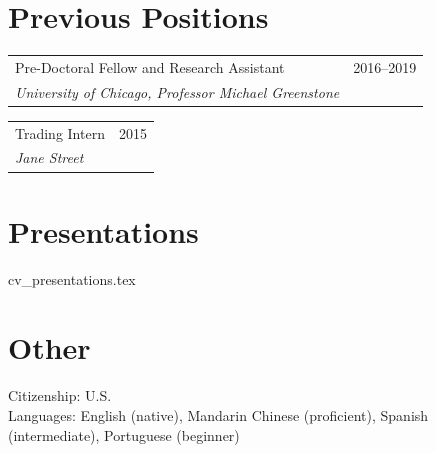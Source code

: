 \documentclass[12pt, a4paper]{article}
\makeatletter
\newcommand{\entry}[3]{%
  \noindent
  \begin{tabular*}{\textwidth}{@{\extracolsep{\fill}} p{0.8\textwidth} r}
    #1 & {\small #2} \\
    \emph{#3} &
  \end{tabular*}%
  \vspace{0.3em}
}
\makeatother
\begin{document}
\section*{Previous Positions}
\entry{Pre-Doctoral Fellow and Research Assistant}{2016–2019}{University of Chicago, Professor Michael Greenstone}
\entry{Trading Intern}{2015}{Jane Street}

\section*{Presentations}
{cv_presentations.tex}

\section*{Other}
Citizenship: U.S.\\
Languages: English (native), Mandarin Chinese (proficient), Spanish (intermediate), Portuguese (beginner)
\end{document}
